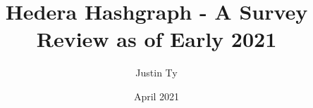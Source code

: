 \documentclass{article}
\begin{document}

\author{Justin Ty}
\title{Hedera Hashgraph - A Survey Review as of Early 2021}
\date{April 2021}

\maketitle







\printbibliography

\end{document}
